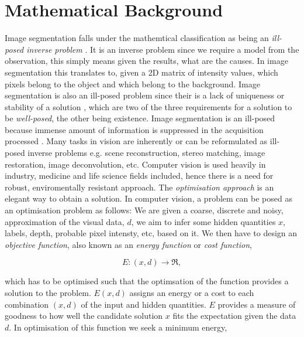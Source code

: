 
\chapter{Mathematical Background} %

\label{chap:Chapter3} %


Image segmentation falls under the mathemtical classification as being an \textit{ill-posed inverse problem} \citep{Poggio1985,Terzopoulos1986}.
It is an inverse problem since we require a model from the observation, this simply means given the results, what are the causes.
In image segmentation this translates to, given a 2D matrix of intensity values, which pixels belong to the object and which belong to the background.
Image segmentation is also an ill-posed problem since their is a lack of uniqueness or stability of a solution \citep{Kabanikhin2008}, which are two of the three requirements for a solution to be \textit{well-posed}, the other being existence.
Image segmentation is an ill-posed because immense amount of information is suppressed in the acquisition processed \citep{Tarantola2005,Bertero1998,Bertero2006}.
Many tasks in vision are inherently or can be reformulated as ill-posed inverse problems e.g. scene reconstruction, stereo matching, image restoration, image deconvolution, etc.
Computer vision is used heavily in industry, medicine and life science fields included, hence there is a need for robust, enviromentally resistant approach.
The \textit{optimisation approach} is an elegant way to obtain a solution.
In computer vision, a problem can be posed as an optimisation problem as follows: We are given a coarse, discrete and noisy, approximation of the visual data, $d$, we aim to infer some hidden quantities $x$, labels, depth, probable pixel intensty, etc, based on it.
We then have to design an \textit{objective function}, also known as an \textit{energy function} or \textit{cost function},

\begin{equation}
	E:(x,d) \rightarrow \Re,
\end{equation}

which has to be optimised such that the optimsation of the function provides a solution to the problem.
$E(x,d)$ assigns an energy or a cost to each combination $(x,d)$ of the input and hidden quantities.
$E$ provides a measure of goodness to how well the candidate solution $x$ fits the expectation given the data $d$.
In optimisation of this function we seek a minimum energy,


